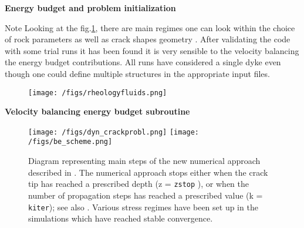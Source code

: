 \documentclass[9pt]{beamer}
\newcommand\Fonttab{\fontsize{12}{7.2}\selectfont}
\begin{document}
\begin{frame}[allowframebreaks]{\textbf{Energy budget and problem initialization}}
\Fonttab
\begin{exampleblock}{Note}
Looking at the fig.\ref{fig:rheo}, there are main regimes one can look within the choice of rock parameters as well as crack shapes geometry \cite{pansino2022}. After validating the code with some trial runs it has been found it is very sensible to the velocity balancing the energy budget contributions. All runs have considered a single dyke even though one could define multiple structures in the appropriate input files. 
\end{exampleblock}
\begin{figure}[b]
    \centering
    \texttt{[image: /figs/rheologyfluids.png]}
    \label{fig:rheo}
\end{figure}
\end{frame}

\begin{frame}[allowframebreaks]{\textbf{Velocity balancing energy budget subroutine}}
\begin{figure}[h]
    \centering
    \texttt{[image: /figs/dyn\_crackprobl.png]}
    \texttt{[image: /figs/be\_scheme.png]}
    \caption{Diagram representing main steps of the new numerical approach described in \colorbox{yellow}{\cite{furst2023}}. The numerical approach stops either when the crack tip has reached a prescribed depth (z = \texttt{zstop} ), or when the number of propagation steps has reached a prescribed value (k = \texttt{kiter}); see also \colorbox{yellow}{\cite{dahm2000a}\cite{dahm2000b}}. Various stress regimes have been set up in the simulations which have reached stable convergence.}
\end{figure}
\end{frame}
\end{document}
